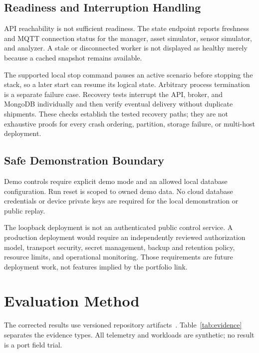 \documentclass[journal]{IEEEtran}
\begin{document}
\subsection{Readiness and Interruption Handling}
API reachability is not sufficient readiness. The state endpoint reports freshness and MQTT connection status for the manager, asset simulator, sensor simulator, and analyzer. A stale or disconnected worker is not displayed as healthy merely because a cached snapshot remains available.

The supported local stop command pauses an active scenario before stopping the stack, so a later start can resume its logical state. Arbitrary process termination is a separate failure case. Recovery tests interrupt the API, broker, and MongoDB individually and then verify eventual delivery without duplicate shipments. These checks establish the tested recovery paths; they are not exhaustive proofs for every crash ordering, partition, storage failure, or multi-host deployment.

\subsection{Safe Demonstration Boundary}
Demo controls require explicit demo mode and an allowed local database configuration. Run reset is scoped to owned demo data. No cloud database credentials or device private keys are required for the local demonstration or public replay.

The loopback deployment is not an authenticated public control service. A production deployment would require an independently reviewed authorization model, transport security, secret management, backup and retention policy, resource limits, and operational monitoring. Those requirements are future deployment work, not features implied by the portfolio link.

\section{Evaluation Method}
The corrected results use versioned repository artifacts~\citep{source,evidence}. Table~\ref{tab:evidence} separates the evidence types. All telemetry and workloads are synthetic; no result is a port field trial.
\end{document}
